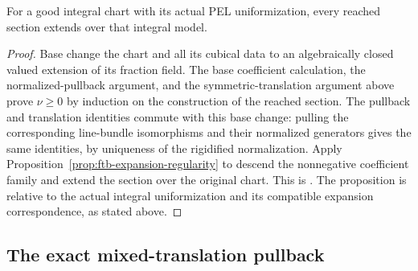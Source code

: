 \begin{srproposition}
\label{prop:ftb-reached-regular}
For a good integral chart with its actual PEL uniformization,
every reached section extends over that integral model.
\end{srproposition}
\begin{proof}
Base change the chart and all its cubical data to an algebraically
closed valued extension of its fraction field.
The base coefficient calculation, the normalized-pullback argument,
and the symmetric-translation argument above prove \(\nu\ge0\)
by induction on the construction of the reached section.
The pullback and translation identities commute with this base
change: pulling the corresponding line-bundle isomorphisms and their
normalized generators gives the same identities, by uniqueness of
the rigidified normalization.
Apply Proposition~\ref{prop:ftb-expansion-regularity} to descend the
nonnegative coefficient family and extend the section over the
original chart.
This is .
The proposition is relative to the actual integral uniformization
and its compatible expansion correspondence, as stated above.
\end{proof}

\subsection{The exact mixed-translation pullback}
\label{subsec:ftb-mixed-pullback}

